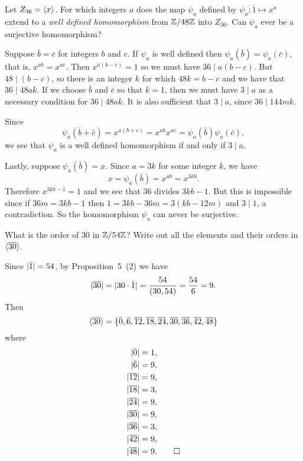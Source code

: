 Let $Z_{36} = \langle{x}\rangle$. For which integers $a$ does the map
$\psi_a$ defined by $\psi_a\colon\bar1\mapsto x^a$ extend to a {\em
  well defined homomorphism} from $\mathbb{Z}/48\mathbb{Z}$ into $Z_{36}$. Can
$\psi_a$ ever be a surjective homomorphism?
\begin{solution}
  Suppose $\bar{b} = \bar{c}$ for integers $b$ and $c$. If $\psi_a$ is
  well defined then $\psi_a(\bar{b}) = \psi_a(\bar{c})$, that is,
  $x^{ab} = x^{ac}$. Then $x^{a(b - c)} = 1$ so we must have
  $36\mid a(b-c)$. But $48\mid(b - c)$, so there is an integer $k$ for
  which $48k = b - c$ and we have that $36\mid48ak$. If we choose
  $\bar{b}$ and $\bar{c}$ so that $k = 1$, then we must have $3\mid a$
  as a necessary condition for $36\mid48ak$. It is also sufficient
  that $3\mid a$, since $36\mid144mk$.

  Since
  \begin{equation*}
    \psi_a(\bar{b} + \bar{c}) = x^{a(b + c)}
    = x^{ab}x^{ac} = \psi_a(\bar{b})\psi_a(\bar{c}),
  \end{equation*}
  we see that $\psi_a$ is a well defined homomorphism if and only if
  $3\mid a$.

  Lastly, suppose $\psi_a(\bar{b}) = x$. Since $a = 3k$ for some
  integer $k$, we have
  \begin{equation*}
    x = \psi_a(\bar{b}) = x^{ab} = x^{3kb}.
  \end{equation*}
  Therefore $x^{3kb - 1} = 1$ and we see that $36$ divides $3kb -
  1$. But this is impossible since if $36m = 3kb - 1$ then
  $1 = 3kb - 36m = 3(kb - 12m)$ and $3\mid1$, a contradiction. So the
  homomorphism $\psi_a$ can never be surjective.
\end{solution}

 What is the order of $\overline{30}$ in $\mathbb{Z}/54\mathbb{Z}$? Write
out all the elements and their orders in $\langle{\overline{30}}\rangle$.
\begin{solution}
  Since $\lvert{\bar1}\rvert = 54$, by Proposition~5~(2) we have
  \begin{equation*}
    \lvert{\overline{30}}\rvert = \lvert{30\cdot\bar1}\rvert = \frac{54}{(30,54)}
    = \frac{54}{6} = 9.
  \end{equation*}
  Then
  \begin{equation*}
    \langle{\overline{30}}\rangle = \{\bar0, \bar6, \overline{12},
    \overline{18}, \overline{24}, \overline{30}, \overline{36},
    \overline{42}, \overline{48}\}
  \end{equation*}
  where
  \begin{align*}
    \lvert{\bar0}\rvert &= 1, \\
    \lvert{\bar6}\rvert &= 9, \\
    \lvert{\overline{12}}\rvert &= 9, \\
    \lvert{\overline{18}}\rvert &= 3, \\
    \lvert{\overline{24}}\rvert &= 9, \\
    \lvert{\overline{30}}\rvert &= 9, \\
    \lvert{\overline{36}}\rvert &= 3, \\
    \lvert{\overline{42}}\rvert &= 9, \\
    \lvert{\overline{48}}\rvert &= 9. \qedhere
  \end{align*}
\end{solution}

